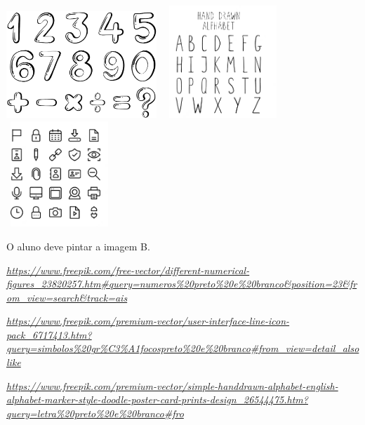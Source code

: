 \includegraphics[width=2.23393in,height=1.58569in]{media/image6.png}\includegraphics[width=1.96211in,height=1.66818in]{media/image7.png}\includegraphics[width=1.56875in,height=1.56875in]{media/image8.png}

O aluno deve pintar a imagem B.


\href{https://www.freepik.com/free-vector/different-numerical-figures_23820257.htm\#query=numeros\%20preto\%20e\%20branco\&position=23\&from_view=search\&track=ais}{\emph{https://www.freepik.com/free-vector/different-numerical-figures\_23820257.htm\#query=numeros\%20preto\%20e\%20branco\&position=23\&from\_view=search\&track=ais}}

\href{https://www.freepik.com/premium-vector/user-interface-line-icon-pack_6717413.htm?query=simbolos\%20gr\%C3\%A1focospreto\%20e\%20branco\#from_view=detail_alsolike}{\emph{https://www.freepik.com/premium-vector/user-interface-line-icon-pack\_6717413.htm?query=simbolos\%20gr\%C3\%A1focospreto\%20e\%20branco\#from\_view=detail\_alsolike}}

\href{https://www.freepik.com/premium-vector/simple-handdrawn-alphabet-english-alphabet-marker-style-doodle-poster-card-prints-design_26544475.htm?query=letra\%20preto\%20e\%20branco\#fro}{\emph{https://www.freepik.com/premium-vector/simple-handdrawn-alphabet-english-alphabet-marker-style-doodle-poster-card-prints-design\_26544475.htm?query=letra\%20preto\%20e\%20branco\#fro}}

